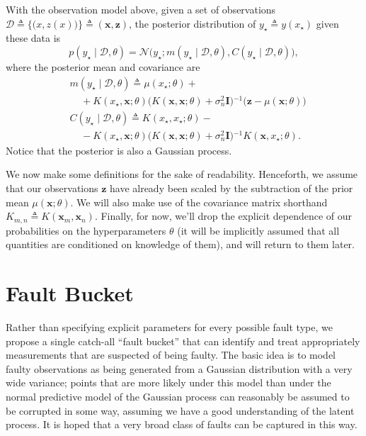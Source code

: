 \documentclass{article}
\newcommand{\deq}{\ensuremath{\triangleq}}
\newcommand{\given}{\ensuremath{\mid}}
\newcommand{\cm}[1]{\ensuremath{\mathcal{#1}}}
\newcommand{\bm}[1]{\ensuremath{\mathbf{#1}}}
\newcommand{\data}{\ensuremath{\cm{D}}}
\newcommand{\inv}{\ensuremath{^{-1}}}
\newcommand{\vect}[1]{\bm{#1}}
\newcommand{\vz}{\vect{z}}
\newcommand{\vx}{\vect{x}}
\newcommand{\mean}[2]{{m}(#1 \given #2 )}
\newcommand{\cov}[2]{{C}(#1 \given #2 )}
\newcommand{\st}{_{\star}}
\newcommand{\defequal}{\triangleq}
\begin{document}
With the observation model above, given a set of observations
$
 \data
 \deq
 \bigl\lbrace
   \bigl( x, z(x) \bigr)
 \bigr\rbrace
 \deq
 ( \bm{x}, \bm{z} )
$,
the posterior distribution of $y\st \deq y(x\st)$ given these data is
\begin{equation*}
 p(y\st \given \data, \theta)
 =
 \cm{N}
 \bigl(
   y\st;
   \mean{y\st}{\data,\theta},
   \cov{y\st}{\data,\theta}
 \bigr),
\end{equation*}
where the posterior mean and covariance are
\begin{align*}
 &
 \mean{y\st}{\data,\theta}
 \deq
 \mu(x\st; \theta)
 +
 {}
 \\
 &
 \mspace{20mu}
 +
 K(x\st, \bm{x}; \theta)
 \bigl(
 K(\bm{x}, \bm{x}; \theta) + \sigma_n^2 \bm{I}
 \bigr)\inv
 \bigl(
   \bm{z} - \mu(\bm{x}; \theta)
 \bigr)
 \\  
 &
 \cov{y\st}{\data,\theta}
 \deq
 K(x\st, x\st; \theta)
 -
 {}
 \\
 &
 \mspace{20mu}
 -
 K(x\st, \bm{x}; \theta)
 \bigl(
   K(\bm{x}, \bm{x}; \theta) + \sigma_n^2 \bm{I}
 \bigr)\inv
 K(\bm{x}, x\st; \theta).
\end{align*}
Notice that the posterior is also a Gaussian process. 

We now make some definitions for the sake of readability. Henceforth,
we assume that our observations $\vz$ have already been scaled by the
subtraction of the prior mean $\mu(\bm{x}; \theta)$. We will also make
use of the covariance matrix shorthand $K_{m,n} \defequal
K(\vx_m,\vx_n)$. Finally, for now, we'll drop the explicit dependence
of our probabilities on the hyperparameters $\theta$ (it will be
implicitly assumed that all quantities are conditioned on knowledge of
them), and will return to them later.

\section{Fault Bucket}
Rather than specifying explicit parameters for every possible fault
type, we propose a single catch-all ``fault bucket'' that can identify
and treat appropriately measurements that are suspected of being
faulty.  The basic idea is to model faulty observations as being
generated from a Gaussian distribution with a very wide variance;
points that are more likely under this model than under the normal
predictive model of the Gaussian process can reasonably be assumed to
be corrupted in some way, assuming we have a good understanding of the
latent process. It is hoped that a very broad class of faults can be
captured in this way.
\end{document}
